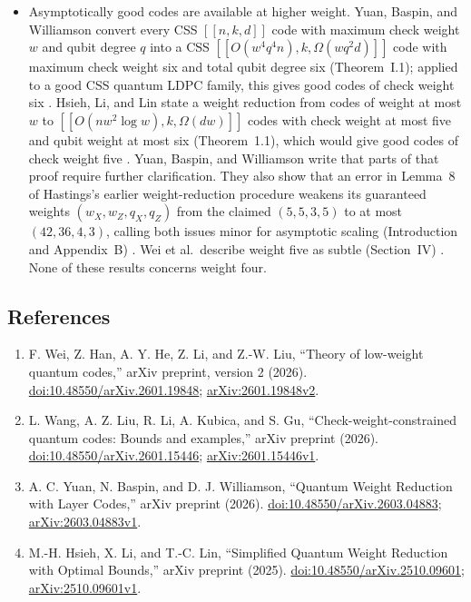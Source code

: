 \begin{itemize}
  \item Asymptotically good codes are available at higher weight. Yuan, Baspin, and Williamson convert every CSS $[[n,k,d]]$ code with maximum check weight $w$ and qubit degree $q$ into a CSS $[[O(w^4q^4n),k,\Omega(wq^2d)]]$ code with maximum check weight six and total qubit degree six (Theorem~I.1); applied to a good CSS quantum LDPC family, this gives good codes of check weight six . Hsieh, Li, and Lin state a weight reduction from codes of weight at most $w$ to $[[O(nw^2\log w),k,\Omega(dw)]]$ codes with check weight at most five and qubit weight at most six (Theorem~1.1), which would give good codes of check weight five . Yuan, Baspin, and Williamson write that parts of that proof require further clarification. They also show that an error in Lemma~8 of Hastings's earlier weight-reduction procedure weakens its guaranteed weights $(w_X,w_Z,q_X,q_Z)$ from the claimed $(5,5,3,5)$ to at most $(42,36,4,3)$, calling both issues minor for asymptotic scaling (Introduction and Appendix~B) . Wei et al.\ describe weight five as subtle (Section~IV) . None of these results concerns weight four.
\end{itemize}

\subsection*{References}

\begin{enumerate}[label={},leftmargin=4.8em,labelsep=0.5em]
  \footnotesize
  \item[\textup{[WHH+26]}]\label{ref:ad47-wei}
  F. Wei, Z. Han, A. Y. He, Z. Li, and Z.-W. Liu, ``Theory of low-weight quantum codes,'' arXiv preprint, version 2 (2026). \href{https://doi.org/10.48550/arXiv.2601.19848}{doi:10.48550/arXiv.2601.19848}; \href{https://arxiv.org/abs/2601.19848v2}{arXiv:2601.19848v2}.

  \item[\textup{[WLL+26]}]\label{ref:ad47-wang}
  L. Wang, A. Z. Liu, R. Li, A. Kubica, and S. Gu, ``Check-weight-constrained quantum codes: Bounds and examples,'' arXiv preprint (2026). \href{https://doi.org/10.48550/arXiv.2601.15446}{doi:10.48550/arXiv.2601.15446}; \href{https://arxiv.org/abs/2601.15446v1}{arXiv:2601.15446v1}.

  \item[\textup{[YBW26]}]\label{ref:ad47-yuan}
  A. C. Yuan, N. Baspin, and D. J. Williamson, ``Quantum Weight Reduction with Layer Codes,'' arXiv preprint (2026). \href{https://doi.org/10.48550/arXiv.2603.04883}{doi:10.48550/arXiv.2603.04883}; \href{https://arxiv.org/abs/2603.04883v1}{arXiv:2603.04883v1}.

  \item[\textup{[HLL25]}]\label{ref:ad47-hsieh}
  M.-H. Hsieh, X. Li, and T.-C. Lin, ``Simplified Quantum Weight Reduction with Optimal Bounds,'' arXiv preprint (2025). \href{https://doi.org/10.48550/arXiv.2510.09601}{doi:10.48550/arXiv.2510.09601}; \href{https://arxiv.org/abs/2510.09601v1}{arXiv:2510.09601v1}.
\end{enumerate}

